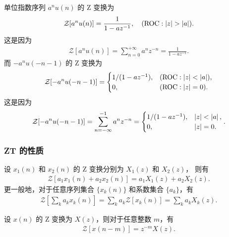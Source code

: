 \begin{example}[单位指数序列的 ZT]
    单位指数序列 $a^n u(n)$ 的 Z 变换为
    \begin{align*}
        \mathcal{Z}[a^n u(n)] = \frac{1}{1 - az^{-1}}, \quad (\text{ROC}: \left|z\right| > \left|a\right|).
    \end{align*}
    这是因为
    \begin{align*}
        \mathcal{Z}[a^n u(n)] = \sum_{n=0}^{+\infty} a^n z^{-n} = \frac{1}{1 - az^{-1}}.
    \end{align*}
    而 $-a^n u(-n-1)$ 的 Z 变换为
    \begin{align*}
        \mathcal{Z}[-a^n u(-n-1)] = \begin{cases}
            1/(1 - az^{-1}), & (\text{ROC}: \left|z\right| < \left|a\right|), \\
            0, & (\text{ROC}: \left|z\right| = 0).
        \end{cases}
    \end{align*}
    这是因为
    \begin{align*}
        \mathcal{Z}[-a^n u(-n-1)] = \sum_{n=-\infty}^{-1} a^n z^{-n}
        = \begin{cases}
            1/(1 - az^{-1}), & \left|z\right| < \left|a\right|, \\
            0, & \left|z\right| = 0.
        \end{cases}.
    \end{align*}
\end{example}

\subsubsection{ZT 的性质}

\begin{property}[ZT 是线性的]
    设 $x_1(n)$ 和 $x_2(n)$ 的 Z 变换分别为 $X_1(z)$ 和 $X_2(z)$，
    则有
    \begin{align*}
        \mathcal{Z}[a_1 x_1(n) + a_2 x_2(n)] = a_1 X_1(z) + a_2 X_2(z).
    \end{align*}
    更一般地，对于任意序列集合 $\{x_k(n)\}$ 和系数集合 $\{a_k\}$，有
    \begin{align*}
        \mathcal{Z}\left[\sum_k a_k x_k(n)\right] = \sum_k a_k \mathcal{Z}[x_k(n)] = \sum_k a_k X_k(z).
    \end{align*}
\end{property}

\begin{property}[ZT 的时域频移性质]
    设 $x(n)$ 的 Z 变换为 $X(z)$，则对于任意整数 $m$，有
    \begin{align*}
        \mathcal{Z}[x(n - m)] = z^{-m} X(z).
    \end{align*}
\end{property}

